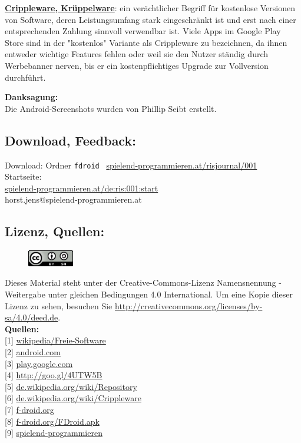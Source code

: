 \href{http://de.wikipedia.org/wiki/Crippleware}{\textbf{Crippleware, Krüppelware}}: ein verächtlicher Begriff für kostenlose Versionen von Software, deren Leistungsumfang stark eingeschränkt ist und erst nach einer entsprechenden Zahlung sinnvoll verwendbar ist. Viele Apps im Google Play Store sind in der "kostenlos" Variante als Crippleware zu bezeichnen, da ihnen entweder wichtige Features fehlen oder weil sie den Nutzer ständig durch Werbebanner nerven, bis er ein kostenpflichtiges Upgrade zur Vollversion durchführt.

\textbf{Danksagung:} \\
Die Android-Screenshots wurden von Phillip Seibt erstellt.

\subsection*{Download, Feedback:}
\footnotesize{
Download: Ordner \texttt{fdroid} \Mundus\ \href{http://spielend-programmieren.at/risjournal/001}{spielend-programmieren.at/risjournal/001}\\
Startseite:\\
\href{http://spielend-programmieren.at/de:ris:001:start}{spielend-programmieren.at/de:ris:001:start}\\ 
\Letter\:  horst.jens@spielend-programmieren.at \\}
\normalsize{}

\subsection*{Lizenz, Quellen:}
\begin{figure}
\includegraphics[width=2cm]{fdroid/ccbysa88x31.png}
\end{figure}
Dieses Material steht unter der Creative-Commons-Lizenz Namensnennung - Weitergabe unter gleichen Bedingungen 4.0 International. Um eine Kopie dieser Lizenz zu sehen, besuchen Sie \url{http://creativecommons.org/licenses/by-sa/4.0/deed.de}. \\

\textbf{Quellen:} \\
{[}1{]} \href{http://de.wikipedia.org/wiki/Freie_Software}{wikipedia/Freie-Software} \\
{[}2{]} \href{http://www.android.com}{android.com} \\
{[}3{]} \href{https://play.google.com/store}{play.google.com} \\
{[}4{]} \href{http://de.wikipedia.org/wiki/GNU_General_Public_License}{http://goo.gl/4UTW5B} \\
{[}5{]} \href{http://de.wikipedia.org/wiki/Repository}{de.wikipedia.org/wiki/Repository} \\
{[}6{]} \href{http://de.wikipedia.org/wiki/Crippleware}{de.wikipedia.org/wiki/Crippleware} \\
{[}7{]} \href{http://f-droid.org/}{f-droid.org} \\
{[}8{]} \href{http://f-droid.org/FDroid.apk}{f-droid.org/FDroid.apk} \\
{[}9{]} \href{http://spielend-programmieren.at}{spielend-programmieren} 
